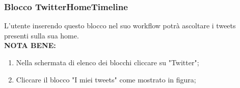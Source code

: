 \subsubsection{Blocco TwitterHomeTimeline} \label{twitterHo}
L'utente inserendo questo blocco nel suo workflow potrà ascoltare i tweets presenti sulla sua home. \\
\textbf{NOTA BENE:}
\newpage
\begin{enumerate}
	\item Nella schermata di elenco dei blocchi cliccare su "Twitter";
	\item Cliccare il blocco "I miei tweets" come mostrato in figura;
	\begin{figure}[!ht]
		\centering

\end{figure}
\end{enumerate}
